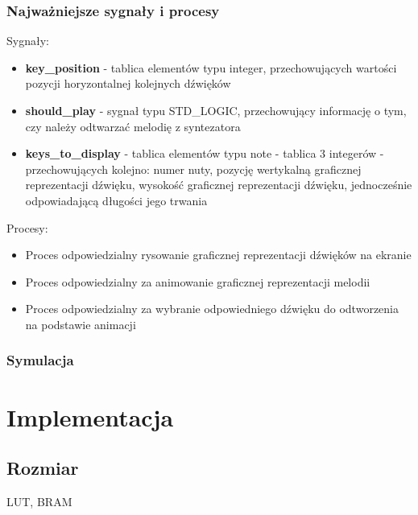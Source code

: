 \documentclass[a4paper]{report}
\begin{document}
		\subsection{Najważniejsze sygnały i procesy}
		{\Large Sygnały:}
			\begin{itemize}
				\item \textbf{key\_position} - tablica elementów typu integer, przechowujących wartości pozycji horyzontalnej kolejnych dźwięków
				\item \textbf{should\_play} - sygnał typu STD\_LOGIC, przechowujący informację o tym, czy należy odtwarzać melodię z syntezatora
				\item \textbf{keys\_to\_display} - tablica elementów typu note - tablica 3 integerów - przechowujących kolejno: numer nuty, pozycję wertykalną graficznej reprezentacji dźwięku, wysokość graficznej reprezentacji dźwięku, jednocześnie odpowiadającą długości jego trwania
			\end{itemize}
		{\Large Procesy:}
			\begin{itemize}
			\item Proces odpowiedzialny rysowanie graficznej reprezentacji dźwięków na ekranie\\
						
			\item Proces odpowiedzialny za animowanie graficznej reprezentacji melodii\\
									
			\item Proces odpowiedzialny za wybranie odpowiedniego dźwięku do odtworzenia na podstawie animacji\\
									
			\end{itemize}
	
		\subsection{Symulacja}
	
\chapter{Implementacja}
	\section{Rozmiar}
	LUT, BRAM
\end{document}
